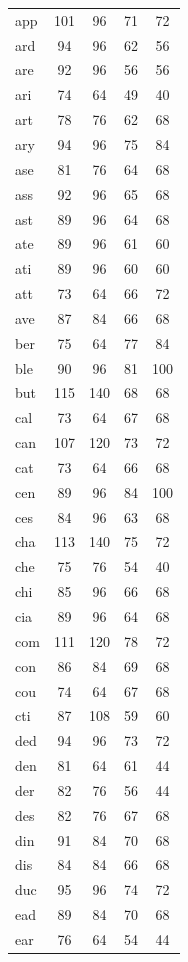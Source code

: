 \documentclass[ms,electronic,twosidetoc,letterpaper,chaptercenter,parttop,lof,lot]{byumsphd}
\begin{document}
\begin{table}
\begin{tabular}{| l | c c | c c |}
  app & 101 & 96 & 71 & 72 \\
  ard & 94 & 96 & 62 & 56 \\
  are & 92 & 96 & 56 & 56 \\
  ari & 74 & 64 & 49 & 40 \\
  art & 78 & 76 & 62 & 68 \\
  ary & 94 & 96 & 75 & 84 \\
  ase & 81 & 76 & 64 & 68 \\
  ass & 92 & 96 & 65 & 68 \\
  ast & 89 & 96 & 64 & 68 \\
  ate & 89 & 96 & 61 & 60 \\
  ati & 89 & 96 & 60 & 60 \\
  att & 73 & 64 & 66 & 72 \\
  ave & 87 & 84 & 66 & 68 \\
  ber & 75 & 64 & 77 & 84 \\
  ble & 90 & 96 & 81 & 100 \\
  but & 115 & 140 & 68 & 68 \\
  cal & 73 & 64 & 67 & 68 \\
  can & 107 & 120 & 73 & 72 \\
  cat & 73 & 64 & 66 & 68 \\
  cen & 89 & 96 & 84 & 100 \\
  ces & 84 & 96 & 63 & 68 \\
  cha & 113 & 140 & 75 & 72 \\
  che & 75 & 76 & 54 & 40 \\
  chi & 85 & 96 & 66 & 68 \\
  cia & 89 & 96 & 64 & 68 \\
  com & 111 & 120 & 78 & 72 \\
  con & 86 & 84 & 69 & 68 \\
  cou & 74 & 64 & 67 & 68 \\
  cti & 87 & 108 & 59 & 60 \\
  ded & 94 & 96 & 73 & 72 \\
  den & 81 & 64 & 61 & 44 \\
  der & 82 & 76 & 56 & 44 \\
  des & 82 & 76 & 67 & 68 \\
  din & 91 & 84 & 70 & 68 \\
  dis & 84 & 84 & 66 & 68 \\
  duc & 95 & 96 & 74 & 72 \\
  ead & 89 & 84 & 70 & 68 \\
  ear & 76 & 64 & 54 & 44 \\

\end{tabular}
\end{table}
\end{document}
